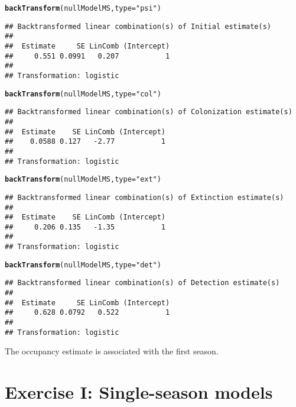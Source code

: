 \documentclass[12pt]{article}\usepackage[]{graphicx}\usepackage[]{xcolor}
\makeatletter
\newcommand{\hlstr}[1]{\textcolor[rgb]{0.192,0.494,0.8}{#1}}%
\newcommand{\hlstd}[1]{\textcolor[rgb]{0.345,0.345,0.345}{#1}}%
\newcommand{\hlkwc}[1]{\textcolor[rgb]{0.333,0.667,0.333}{#1}}%
\newcommand{\hlkwd}[1]{\textcolor[rgb]{0.737,0.353,0.396}{\textbf{#1}}}%
\newenvironment{kframe}{%
 \def\at@end@of@kframe{}%
 \ifinner\ifhmode%
  \def\at@end@of@kframe{\end{minipage}}%
  \begin{minipage}{\columnwidth}%
 \fi\fi%
 \def\FrameCommand##1{\hskip\@totalleftmargin \hskip-\fboxsep
 \colorbox{shadecolor}{##1}\hskip-\fboxsep
     \hskip-\linewidth \hskip-\@totalleftmargin \hskip\columnwidth}%
 \MakeFramed {\advance\hsize-\width
   \@totalleftmargin\z@ \linewidth\hsize
   \@setminipage}}%
 {\par\unskip\endMakeFramed%
 \at@end@of@kframe}
\newenvironment{knitrout}{}{} %
\makeatother
\begin{document}
\begin{knitrout}
\color{fgcolor}\begin{kframe}
\begin{alltt}
\hlkwd{backTransform}\hlstd{(nullModelMS,} \hlkwc{type}\hlstd{=}\hlstr{"psi"}\hlstd{)}
\end{alltt}
\begin{verbatim}
## Backtransformed linear combination(s) of Initial estimate(s)
## 
##  Estimate     SE LinComb (Intercept)
##     0.551 0.0991   0.207           1
## 
## Transformation: logistic
\end{verbatim}
\begin{alltt}
\hlkwd{backTransform}\hlstd{(nullModelMS,} \hlkwc{type}\hlstd{=}\hlstr{"col"}\hlstd{)}
\end{alltt}
\begin{verbatim}
## Backtransformed linear combination(s) of Colonization estimate(s)
## 
##  Estimate    SE LinComb (Intercept)
##    0.0588 0.127   -2.77           1
## 
## Transformation: logistic
\end{verbatim}
\begin{alltt}
\hlkwd{backTransform}\hlstd{(nullModelMS,} \hlkwc{type}\hlstd{=}\hlstr{"ext"}\hlstd{)}
\end{alltt}
\begin{verbatim}
## Backtransformed linear combination(s) of Extinction estimate(s)
## 
##  Estimate    SE LinComb (Intercept)
##     0.206 0.135   -1.35           1
## 
## Transformation: logistic
\end{verbatim}
\begin{alltt}
\hlkwd{backTransform}\hlstd{(nullModelMS,} \hlkwc{type}\hlstd{=}\hlstr{"det"}\hlstd{)}
\end{alltt}
\begin{verbatim}
## Backtransformed linear combination(s) of Detection estimate(s)
## 
##  Estimate     SE LinComb (Intercept)
##     0.628 0.0792   0.522           1
## 
## Transformation: logistic
\end{verbatim}
\end{kframe}
\end{knitrout}

The occupancy estimate is associated with the first season. 




\clearpage

\section*{Exercise I: Single-season models}
\end{document}

